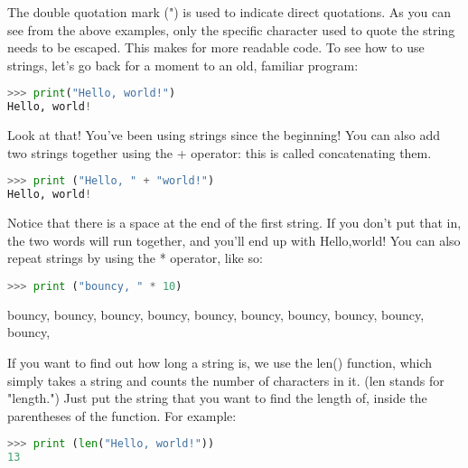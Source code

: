 The double quotation mark (") is used to indicate direct quotations.  As you can
see from the above examples, only the specific character used to quote the
string needs to be escaped. This makes for more readable code.  To see how to
use strings, let's go back for a moment to an old, familiar program:
\lstset{basicstyle=\scriptsize, numbers=left, captionpos=b,breaklines=true, tabsize=4}
\begin{lstlisting}[caption=String 3,language={Python},
xleftmargin=15pt, label=lst:string3]
>>> print("Hello, world!")
Hello, world!
\end{lstlisting}

Look at that! You've been using strings since the beginning! You can also add
two strings together using the + operator: this is called concatenating them.
\lstset{basicstyle=\scriptsize, numbers=left, captionpos=b,breaklines=true, tabsize=4}
\begin{lstlisting}[caption=String 4,language={Python},
xleftmargin=15pt, label=lst:string4]
>>> print ("Hello, " + "world!")
Hello, world! 
\end{lstlisting}

Notice that there is a space at the end of the first string. If you don't put
that in, the two words will run together, and you'll end up with Hello,world!
You can also repeat strings by using the * operator, like so:
\lstset{basicstyle=\scriptsize, numbers=left, captionpos=b,breaklines=true, tabsize=4}
\begin{lstlisting}[caption=String 5,language={Python},
xleftmargin=15pt, label=lst:string5]
>>> print ("bouncy, " * 10)
\end{lstlisting}
bouncy, bouncy, bouncy, bouncy, bouncy, bouncy, bouncy, bouncy, bouncy, bouncy,

If you want to find out how long a string is, we use the len() function, which
simply takes a string and counts the number of characters in it. (len stands for
"length.") Just put the string that you want to find the length of, inside the
parentheses of the function. For example:
\lstset{basicstyle=\scriptsize, numbers=left, captionpos=b,breaklines=true, tabsize=4}
\begin{lstlisting}[caption=String 6,language={Python},
xleftmargin=15pt, label=lst:string6]
>>> print (len("Hello, world!"))
13
\end{lstlisting}

